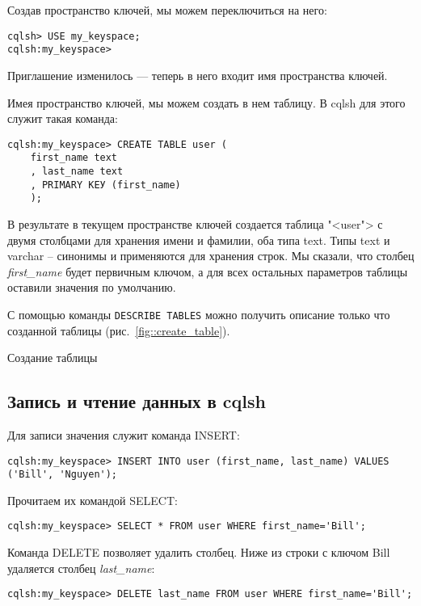 Создав пространство ключей, мы можем переключиться на него:
\begin{verbatim}
cqlsh> USE my_keyspace;
cqlsh:my_keyspace>
\end{verbatim}

Приглашение изменилось --- теперь в него входит имя пространства ключей.\par
Имея пространство ключей, мы можем создать в нем таблицу. В cqlsh для
этого служит такая команда:

\begin{verbatim}
cqlsh:my_keyspace> CREATE TABLE user (
	first_name text
	, last_name text
	, PRIМARY КЕУ (first_name)
	);
\end{verbatim}

В результате в текущем пространстве ключей создается таблица "<user"> с
двумя столбцами для хранения имени и фамилии, оба типа text. Типы text и
varchar -- синонимы и применяются для хранения строк. Мы сказали, что
столбец \textit{first\_name} будет первичным ключом, а для всех остальных
параметров таблицы оставили значения по умолчанию.\par
С помощью команды \texttt{DESCRIBE TABLES} можно получить описание только
что созданной таблицы (рис.~\ref{fig::create_table}).

\begin{image}
	\caption{Создание таблицы}
	\label{fig::create_table}
\end{image}

\subsection{Запись и чтение данных в cqlsh}
Для записи значения служит команда INSERT:

\begin{verbatim}
cqlsh:my_keyspace> INSERT INTO user (first_name, last_name) VALUES
('Bill', 'Nguyen');
\end{verbatim}

Прочитаем их командой SELECT:

\begin{verbatim}
cqlsh:my_keyspace> SELECT * FROM user WHERE first_name='Bill';
\end{verbatim}

Команда DELETE позволяет удалить столбец. Ниже из строки с ключом Bill
удаляется столбец \textit{last\_name}:

\begin{verbatim}
cqlsh:my_keyspace> DELETE last_name FROM user WHERE first_name='Bill';
\end{verbatim}


